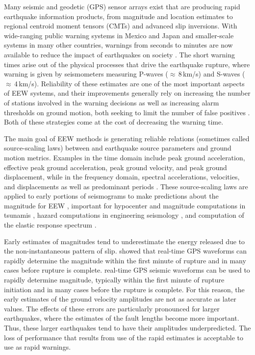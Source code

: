 \documentclass[preprint, aps, showpacs]{revtex4-1}
\begin{document}
Many seismic and geodetic (GPS) sensor arrays exist that are producing rapid earthquake information products, from magnitude and location estimates to regional centroid moment tensors (CMTs) and advanced slip inversions.
With wide-ranging public warning systems in Mexico and Japan and smaller-scale systems in many other countries, warnings from seconds to minutes are now available to reduce the impact of earthquakes on society \cite{StAl2016}.
The short warning times arise out of the physical processes that drive the earthquake rupture, where warning is given by seismometers measuring P-waves ($\approx$\,8\,km/s) and S-waves ($\approx$\,4\,km/s).
Reliability of these estimates are one of the most important aspects of EEW systems, and their improvements generally rely on increasing the number of stations involved in the warning decisions as well as increasing alarm thresholds on ground motion, both seeking to limit the number of false positives \cite{KuCo2015}. Both of these strategies come at the cost of decreasing the warning time.

The main goal of EEW methods is generating reliable relations (sometimes called source-scaling laws) between and earthquake source parameters and ground motion metrics. Examples in the time domain include peak ground acceleration, effective peak ground acceleration, peak ground velocity, and peak
ground displacement, while in the frequency domain, spectral accelerations, velocities, and displacements as well as predominant periods \cite{Do2003}. These source-scaling laws are applied to early portions of seismograms to make predictions about the magnitude for EEW \cite{AlGa2009}, important for hypocenter and magnitude computations in tsunamis \cite{MeCr2015}, hazard computations in engineering seismology \cite{PaMu2012}, and computation of the elastic response spectrum \cite{Ch2007}.

Early estimates of magnitudes tend to underestimate the energy released due to the non-instantaneous pattern of slip.
\cite{MeCr2015} showed that real-time GPS waveforms can rapidly determine the magnitude within the first minute of rupture and in many cases before rupture is complete.
real-time GPS seismic waveforms can be used to rapidly determine magnitude, typically within the first minute of rupture initiation and in many cases before the rupture is complete. 
For this reason, the early estimates of the ground velocity amplitudes are not as accurate as later values. 
The effects of these errors are particularly pronounced for larger earthquakes, where the estimates of the fault lengths become more important.
Thus, these larger earthquakes tend to have their amplitudes underpredicted.
The loss of performance that results from use of the rapid estimates is acceptable to use as rapid warnings.
\end{document}
